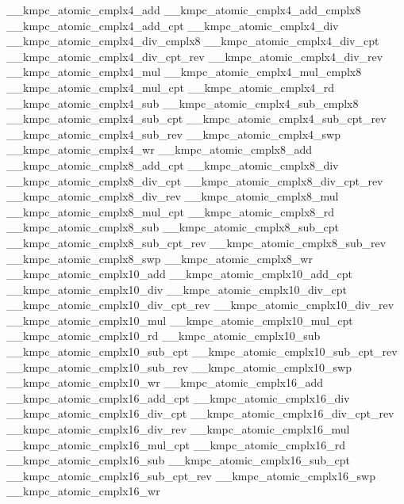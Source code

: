\begin{DoxyCode}
\_\_kmpc\_atomic\_cmplx4\_add
\_\_kmpc\_atomic\_cmplx4\_add\_cmplx8
\_\_kmpc\_atomic\_cmplx4\_add\_cpt
\_\_kmpc\_atomic\_cmplx4\_div
\_\_kmpc\_atomic\_cmplx4\_div\_cmplx8
\_\_kmpc\_atomic\_cmplx4\_div\_cpt
\_\_kmpc\_atomic\_cmplx4\_div\_cpt\_rev
\_\_kmpc\_atomic\_cmplx4\_div\_rev
\_\_kmpc\_atomic\_cmplx4\_mul
\_\_kmpc\_atomic\_cmplx4\_mul\_cmplx8
\_\_kmpc\_atomic\_cmplx4\_mul\_cpt
\_\_kmpc\_atomic\_cmplx4\_rd
\_\_kmpc\_atomic\_cmplx4\_sub
\_\_kmpc\_atomic\_cmplx4\_sub\_cmplx8
\_\_kmpc\_atomic\_cmplx4\_sub\_cpt
\_\_kmpc\_atomic\_cmplx4\_sub\_cpt\_rev
\_\_kmpc\_atomic\_cmplx4\_sub\_rev
\_\_kmpc\_atomic\_cmplx4\_swp
\_\_kmpc\_atomic\_cmplx4\_wr
\_\_kmpc\_atomic\_cmplx8\_add
\_\_kmpc\_atomic\_cmplx8\_add\_cpt
\_\_kmpc\_atomic\_cmplx8\_div
\_\_kmpc\_atomic\_cmplx8\_div\_cpt
\_\_kmpc\_atomic\_cmplx8\_div\_cpt\_rev
\_\_kmpc\_atomic\_cmplx8\_div\_rev
\_\_kmpc\_atomic\_cmplx8\_mul
\_\_kmpc\_atomic\_cmplx8\_mul\_cpt
\_\_kmpc\_atomic\_cmplx8\_rd
\_\_kmpc\_atomic\_cmplx8\_sub
\_\_kmpc\_atomic\_cmplx8\_sub\_cpt
\_\_kmpc\_atomic\_cmplx8\_sub\_cpt\_rev
\_\_kmpc\_atomic\_cmplx8\_sub\_rev
\_\_kmpc\_atomic\_cmplx8\_swp
\_\_kmpc\_atomic\_cmplx8\_wr
\_\_kmpc\_atomic\_cmplx10\_add
\_\_kmpc\_atomic\_cmplx10\_add\_cpt
\_\_kmpc\_atomic\_cmplx10\_div
\_\_kmpc\_atomic\_cmplx10\_div\_cpt
\_\_kmpc\_atomic\_cmplx10\_div\_cpt\_rev
\_\_kmpc\_atomic\_cmplx10\_div\_rev
\_\_kmpc\_atomic\_cmplx10\_mul
\_\_kmpc\_atomic\_cmplx10\_mul\_cpt
\_\_kmpc\_atomic\_cmplx10\_rd
\_\_kmpc\_atomic\_cmplx10\_sub
\_\_kmpc\_atomic\_cmplx10\_sub\_cpt
\_\_kmpc\_atomic\_cmplx10\_sub\_cpt\_rev
\_\_kmpc\_atomic\_cmplx10\_sub\_rev
\_\_kmpc\_atomic\_cmplx10\_swp
\_\_kmpc\_atomic\_cmplx10\_wr
\_\_kmpc\_atomic\_cmplx16\_add
\_\_kmpc\_atomic\_cmplx16\_add\_cpt
\_\_kmpc\_atomic\_cmplx16\_div
\_\_kmpc\_atomic\_cmplx16\_div\_cpt
\_\_kmpc\_atomic\_cmplx16\_div\_cpt\_rev
\_\_kmpc\_atomic\_cmplx16\_div\_rev
\_\_kmpc\_atomic\_cmplx16\_mul
\_\_kmpc\_atomic\_cmplx16\_mul\_cpt
\_\_kmpc\_atomic\_cmplx16\_rd
\_\_kmpc\_atomic\_cmplx16\_sub
\_\_kmpc\_atomic\_cmplx16\_sub\_cpt
\_\_kmpc\_atomic\_cmplx16\_sub\_cpt\_rev
\_\_kmpc\_atomic\_cmplx16\_swp
\_\_kmpc\_atomic\_cmplx16\_wr
\end{DoxyCode}
 